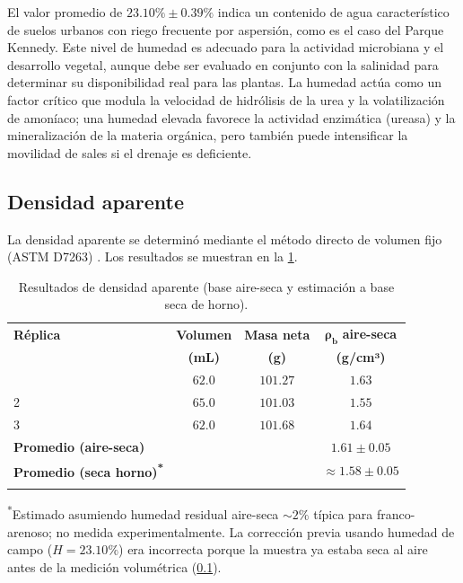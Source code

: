 \documentclass[fleqn]{jaes}
\begin{document}
El valor promedio de $23.10\% \pm 0.39\%$ indica un contenido de agua característico de suelos urbanos con riego frecuente por aspersión, como es el caso del Parque Kennedy. Este nivel de humedad es adecuado para la actividad microbiana y el desarrollo vegetal, aunque debe ser evaluado en conjunto con la salinidad para determinar su disponibilidad real para las plantas. La humedad actúa como un factor crítico que modula la velocidad de hidrólisis de la urea y la volatilización de amoníaco; una humedad elevada favorece la actividad enzimática (ureasa) y la mineralización de la materia orgánica, pero también puede intensificar la movilidad de sales si el drenaje es deficiente.

\subsection{Densidad aparente}\label{subsec:densidad}

La densidad aparente se determinó mediante el método directo de volumen fijo (ASTM D7263) \cite{ASTMInternational2009}. Los resultados se muestran en la \cref{tab:densidad}.

\begin{table}[!ht]
\centering
\small
\caption{Resultados de densidad aparente (base aire-seca y estimación a base seca de horno).}\label{tab:densidad}
\begin{tabular}{@{}lccc@{}}
\toprule
\textbf{Réplica} & \textbf{Volumen} & \textbf{Masa neta} & $\boldsymbol{\rho_b}$ \textbf{aire-seca} \\
 & \textbf{(mL)} & \textbf{(g)} & \textbf{(g/cm³)} \\
\colrule
1 & $62.0$ & $101.27$ & $1.63$ \\
2 & $65.0$ & $101.03$ & $1.55$ \\
3 & $62.0$ & $101.68$ & $1.64$ \\
\colrule
\textbf{Promedio (aire-seca)} & & & $1.61 \pm 0.05$ \\
\textbf{Promedio (seca horno)\textsuperscript{*}} & & & $\approx 1.58 \pm 0.05$ \\
\botrule
\end{tabular}
\begin{tabnote}
\textsuperscript{*}Estimado asumiendo humedad residual aire-seca $\sim 2\%$ típica para franco-arenoso; no medida experimentalmente. La corrección previa usando humedad de campo ($H=23.10\%$) era incorrecta porque la muestra ya estaba seca al aire antes de la medición volumétrica (\cref{subsec:densidad}).
\end{tabnote}
\end{table}
\end{document}
